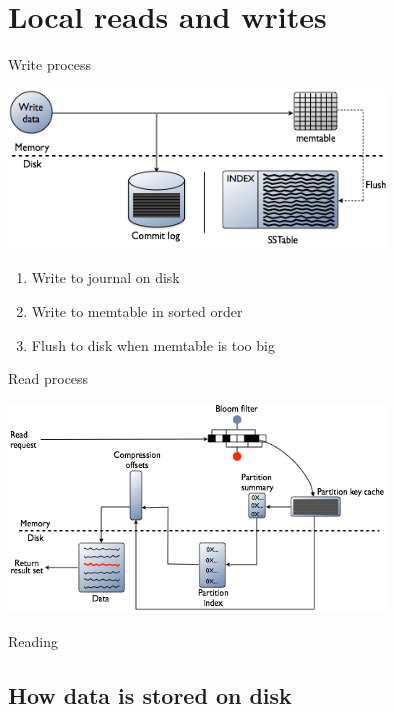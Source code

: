 \documentclass[
  10pt
]{beamer}
\begin{document}
\section{Local reads and writes}  %
\begin{frame}{Write process \cite{datastaxWriteData}}
  \begin{center}
    \includegraphics[width=0.75\textwidth]{resources/local_write.png}
    \begin{enumerate}
      \item<+-> Write to journal on disk
      \item<+-> Write to memtable in sorted order
      \item<+-> Flush to disk when memtable is too big
    \end{enumerate}
  \end{center}
\end{frame}

\begin{frame}{Read process \cite{datastaxReadData}}
  \begin{center}
    \includegraphics[width=0.75\textwidth]{resources/local_read.png}
  \end{center}

  Reading
\end{frame}

\subsection{How data is stored on disk}  %
\end{document}
